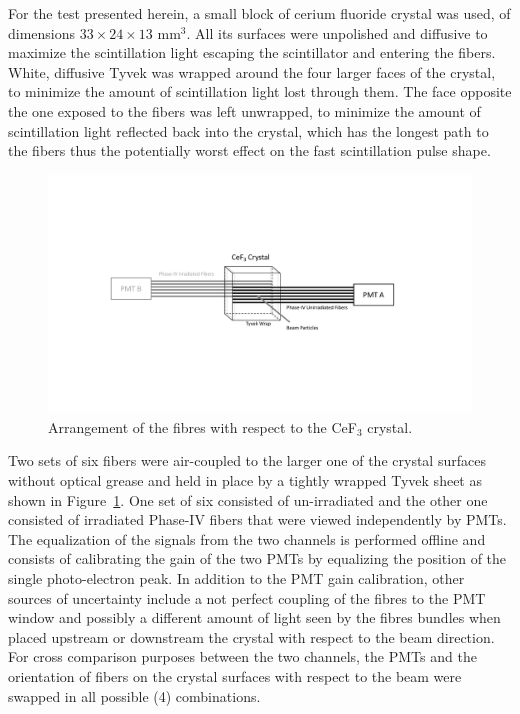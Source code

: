 \documentclass[a4paper,11pt]{article}
\begin{document}
For the test presented herein, a small block of cerium fluoride crystal was used, of dimensions $33\times 24 \times13$ mm$^3$. All its surfaces were unpolished and diffusive to maximize the scintillation light escaping the scintillator and entering the fibers. White, diffusive Tyvek was wrapped around the four larger faces of the crystal, to minimize the amount of scintillation light lost through them. The face opposite the one exposed to the fibers was left unwrapped, to minimize the amount of scintillation light reflected back into the crystal, which has the longest path to the fibers thus the potentially worst effect on the fast scintillation pulse shape.
\begin{figure}[ht]
\begin{center}\vspace{-1pc}
      \includegraphics[width=10 cm]{Figures/CeF3Arrangement.pdf}
\caption{\small Arrangement of the fibres with respect to the CeF$_3$ crystal.}
    \label{fig:CeF3Arrangement}
\end{center}
\end{figure}
Two sets of six fibers were air-coupled to the larger one of the crystal surfaces without optical grease and held in place by a tightly wrapped Tyvek sheet as shown in Figure~\ref{fig:CeF3Arrangement}. One set of six consisted of un-irradiated and the other one consisted of irradiated Phase-IV fibers that were viewed independently by PMTs. The equalization of the signals from the two channels is performed offline and consists of calibrating the gain of the two PMTs by equalizing the position of the single photo-electron peak. In addition to the PMT gain calibration, other sources of uncertainty include a not perfect coupling of the fibres to the PMT window and possibly a different amount of light seen by the fibres bundles when placed upstream or downstream the crystal with respect to the beam direction. For cross comparison purposes between the two channels, the PMTs and the orientation of fibers on the crystal surfaces with respect to the beam were swapped in all possible (4) combinations.
\end{document}
